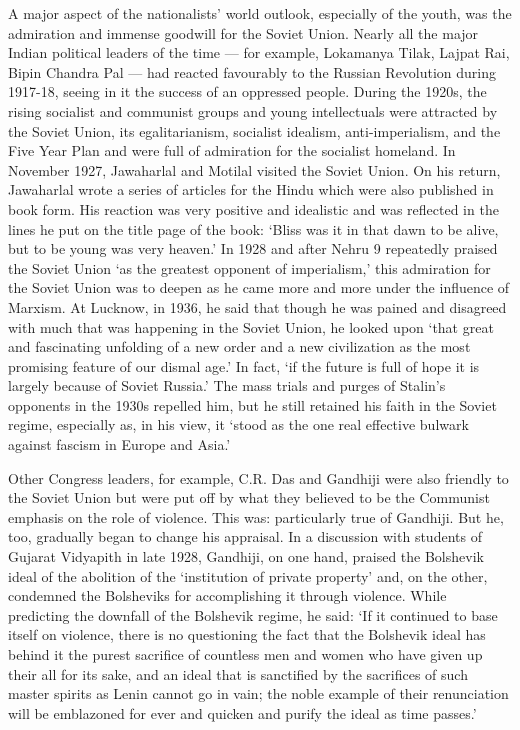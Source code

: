 A major aspect of the nationalists' world outlook, especially of the youth, was the admiration and immense goodwill for the Soviet Union. Nearly all the major Indian political leaders of the time — for example, Lokamanya Tilak, Lajpat Rai, Bipin Chandra Pal — had reacted favourably to the Russian Revolution during 1917-18, seeing in it the success of an oppressed people. During the 1920s, the rising socialist and communist groups and young intellectuals were attracted by the Soviet Union, its egalitarianism, socialist idealism, anti-imperialism, and the Five Year Plan and were full of admiration for the socialist homeland. In November 1927, Jawaharlal and Motilal visited the Soviet Union. On his return, Jawaharlal wrote a series of articles for the Hindu which were also published in book form. His reaction was very positive and idealistic and was reflected in the lines he put on the title page of the book: `Bliss was it in that dawn to be alive, but to be young was very heaven.' In 1928 and after Nehru 9 repeatedly praised the Soviet Union `as the greatest opponent of imperialism,' this admiration for the Soviet Union was to deepen as he came more and more under the influence of Marxism. At Lucknow, in 1936, he said that though he was pained and disagreed with much that was happening in the Soviet Union, he looked upon `that great and fascinating unfolding of a new order and a new civilization as the most promising feature of our dismal age.' In fact, `if the future is full of hope it is largely because of Soviet Russia.' The mass trials and purges of Stalin's opponents in the 1930s repelled him, but he still retained his faith in the Soviet regime, especially as, in his view, it `stood as the one real effective bulwark against fascism in Europe and Asia.' 

Other Congress leaders, for example, C.R. Das and Gandhiji were also friendly to the Soviet Union but were put off by what they believed to be the Communist emphasis on the role of violence. This was: particularly true of Gandhiji. But he, too, gradually began to change his appraisal. In a discussion with students of Gujarat Vidyapith in late 1928, Gandhiji, on one hand, praised the Bolshevik ideal of the abolition of the `institution of private property' and, on the other, condemned the Bolsheviks for accomplishing it through violence. While predicting the downfall of the Bolshevik regime, he said: `If it continued to base itself on violence, there is no questioning the fact that the Bolshevik ideal has behind it the purest sacrifice of countless men and women who have given up their all for its sake, and an ideal that is sanctified by the sacrifices of such master spirits as Lenin cannot go in vain; the noble example of their renunciation will be emblazoned for ever and quicken and purify the ideal as time passes.' 


